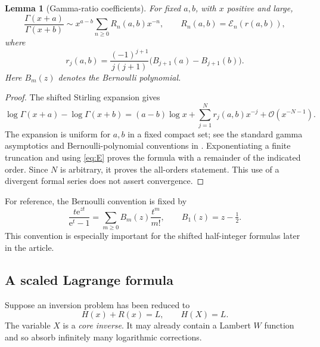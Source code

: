 \documentclass[11pt,a4paper]{article}
\numberwithin{equation}{section}
\newtheorem{lemma}[theorem]{Lemma}
\theoremstyle{definition}
\theoremstyle{remark}
\newcommand{\ee}{\mathrm e}
\newcommand{\cE}{\mathcal E}
\newcommand{\bigO}{\mathcal O}
\begin{document}
\begin{lemma}[Gamma-ratio coefficients]
\label{lem:ratio}
For fixed $a,b$, with $x$ positive and large,
\begin{equation}
 \frac{\Gamma(x+a)}{\Gamma(x+b)}
 \sim x^{a-b}\sum_{n\ge0}R_n(a,b)x^{-n},
 \qquad R_n(a,b)=\cE_n(r(a,b)),
 \label{eq:ratio}
\end{equation}
where
\begin{equation}
 r_j(a,b)=\frac{(-1)^{j+1}}{j(j+1)}
          \bigl(B_{j+1}(a)-B_{j+1}(b)\bigr).
 \label{eq:ratio-log}
\end{equation}
Here $B_m(z)$ denotes the Bernoulli polynomial.
\end{lemma}
\begin{proof}
The shifted Stirling expansion gives
\[
 \log\Gamma(x+a)-\log\Gamma(x+b)
 =(a-b)\log x+\sum_{j=1}^{N}r_j(a,b)x^{-j}
       +\bigO(x^{-N-1}).
\]
The expansion is uniform for $a,b$ in a fixed compact set; see the standard gamma asymptotics and Bernoulli-polynomial conventions in \cite{dlmfgamma,dlmfbernoulli}. Exponentiating a finite truncation and using \eqref{eq:E} proves the formula with a remainder of the indicated order. Since $N$ is arbitrary, it proves the all-orders statement. This use of a divergent formal series does not assert convergence.
\end{proof}

For reference, the Bernoulli convention is fixed by
\[
 \frac{t\ee^{zt}}{\ee^t-1}=\sum_{m\ge0}B_m(z)\frac{t^m}{m!},
 \qquad B_1(z)=z-\tfrac12.
\]
This convention is especially important for the shifted half-integer formulas later in the article.

\subsection{A scaled Lagrange formula}

Suppose an inversion problem has been reduced to
\begin{equation}
 H(x)+R(x)=L,\qquad H(X)=L.
 \label{eq:core-equation}
\end{equation}
The variable $X$ is a \emph{core inverse}. It may already contain a Lambert $W$ function and so absorb infinitely many logarithmic corrections.
\end{document}
